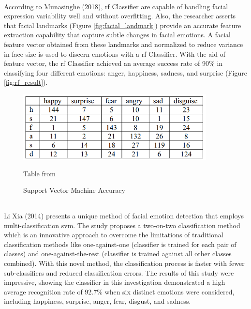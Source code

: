 \\
\indent According to Munasinghe (2018), \gls{rf} Classifier are capable of handling facial expression variability well and without overfitting.
Also, the researcher asserts that facial landmarks (Figure \ref{fig:facial_landmark}) provide an accurate feature extraction capability that capture subtle changes in facial emotions.
A facial feature vector obtained from these landmarks and normalized to reduce variance in face size is used to discern emotions with a \gls{rf} Classifier.
With the aid of feature vector, the \gls{rf} Classifier achieved an average success rate of 90\% in classifying four different emotions: anger, happiness, sadness, and surprise (Figure \ref{fig:rf_result}).
\\
\begin{figure}[!ht]
    \centering
    \includegraphics[width=10cm]{Images/svm_result.png}
    \caption{Support Vector Machine Accuracy} \footnotesize{Table from \cite{xia_2014_facial}}
    \label{fig:svm_result}
\end{figure}
\\
\indent Li Xia (2014) presents a unique method of facial emotion detection that employs multi-classification \gls{svm}.
The study proposes a two-on-two classification method which is an innovative approach to overcome the limitations of traditional classification methods like one-against-one (classifier is trained for each pair of classes) and one-against-the-rest (classifier is trained against all other classes combined).
With this novel method, the classification process is faster with fewer sub-classifiers and reduced classification errors.
The results of this study were impressive, showing the classifier in this investigation demonstrated a high average recognition rate of 92.7\% when six distinct emotions were considered, including happiness, surprise, anger, fear, disgust, and sadness. 
\\
